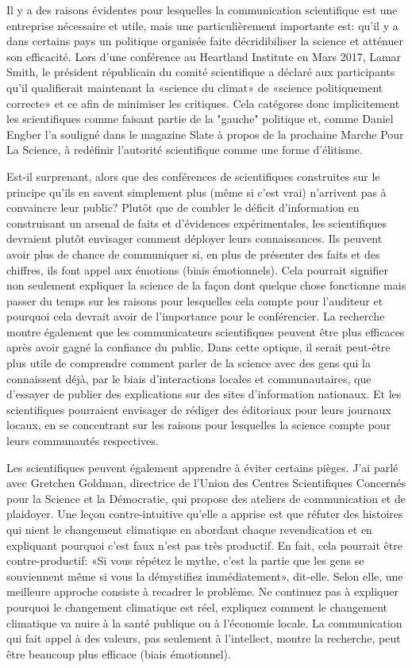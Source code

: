 	Il y a des raisons évidentes pour lesquelles la communication scientifique est une entreprise nécessaire et utile, mais une particulièrement importante est: qu'il y a dans certains pays un politique organisée faite décridibiliser la science et atténuer son efficacité. Lors d'une conférence au Heartland Institute en Mars 2017, Lamar Smith, le président républicain du comité scientifique a déclaré aux participants qu'il qualifierait maintenant la «science du climat» de «science politiquement correcte» et ce afin de minimiser les critiques. Cela catégorse donc implicitement les scientifiques comme faisant partie de la "gauche" politique et, comme Daniel Engber l'a souligné dans le magazine Slate à propos de la prochaine Marche Pour La Science, à redéfinir l'autorité scientifique comme une forme d'élitisme.

	Est-il surprenant, alors que des conférences de scientifiques construites sur le principe qu'ils en savent simplement plus (même si c'est vrai) n'arrivent pas à convaincre leur public? Plutôt que de combler le déficit d'information en construisant un arsenal de faits et d'évidences expérimentales, les scientifiques devraient plutôt envisager comment déployer leurs connaissances. Ils peuvent avoir plus de chance de communiquer si, en plus de présenter des faits et des chiffres, ils font appel aux émotions (biais émotionnels). Cela pourrait signifier non seulement expliquer la science de la façon dont quelque chose fonctionne mais passer du temps sur les raisons pour lesquelles cela compte pour l'auditeur et pourquoi cela devrait avoir de l'importance pour le conférencier. La recherche montre également que les communicateurs scientifiques peuvent être plus efficaces après avoir gagné la confiance du public. Dans cette optique, il serait peut-être plus utile de comprendre comment parler de la science avec des gens qui la connaissent déjà, par le biais d'interactions locales et communautaires, que d'essayer de publier des explications sur des sites d'information nationaux. Et les scientifiques pourraient envisager de rédiger des éditoriaux pour leurs journaux locaux, en se concentrant sur les raisons pour lesquelles la science compte pour leurs communautés respectives.

	Les scientifiques peuvent également apprendre à éviter certains pièges. J'ai parlé avec Gretchen Goldman, directrice de l'Union des Centres Scientifiques Concernés pour la Science et la Démocratie, qui propose des ateliers de communication et de plaidoyer. Une leçon contre-intuitive qu'elle a apprise est que réfuter des histoires qui nient le changement climatique en abordant chaque revendication et en expliquant pourquoi c'est faux n'est pas très productif. En fait, cela pourrait être contre-productif: «Si vous répétez le mythe, c'est la partie que les gens se souviennent même si vous la démystifiez immédiatement», dit-elle. Selon elle, une meilleure approche consiste à recadrer le problème. Ne continuez pas à expliquer pourquoi le changement climatique est réel, expliquez comment le changement climatique va nuire à la santé publique ou à l'économie locale. La communication qui fait appel à des valeurs, pas seulement à l'intellect, montre la recherche, peut être beaucoup plus efficace (biais émotionnel).

